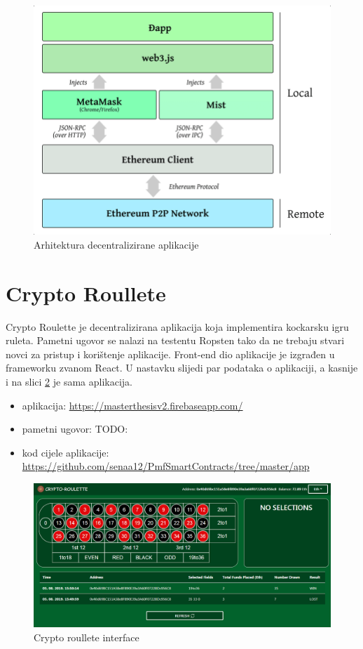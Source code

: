 \documentclass[a4paper,oneside,12pt]{memoir} %
\begin{document}
\begin{figure}[H]
\centering
\includegraphics[scale=0.4]{dapp-architecture}
\caption{Arhitektura decentralizirane aplikacije}
\label{fig:dapp}
\end{figure}

\section{Crypto Roullete}

Crypto Roulette je decentralizirana aplikacija koja implementira kockarsku igru ruleta. Pametni ugovor se nalazi na testentu Ropsten tako da ne trebaju stvari novci za pristup i korištenje aplikacije. Front-end dio aplikacije je izgrađen u frameworku zvanom React. U nastavku slijedi par podataka o aplikaciji, a kasnije i na slici \ref{fig:crypto} je sama aplikacija. 

\begin{itemize}
    \item aplikacija: \url{https://masterthesisv2.firebaseapp.com/}
    \item pametni ugovor: TODO:\url{}
    \item kod cijele aplikacije: \url{https://github.com/senaa12/PmfSmartContracts/tree/master/app}
\end{itemize}

\begin{figure}[H]
\centering
\includegraphics[scale=0.44]{screenshot}
\caption{Crypto roullete interface}
\label{fig:crypto}
\end{figure}
\end{document}
